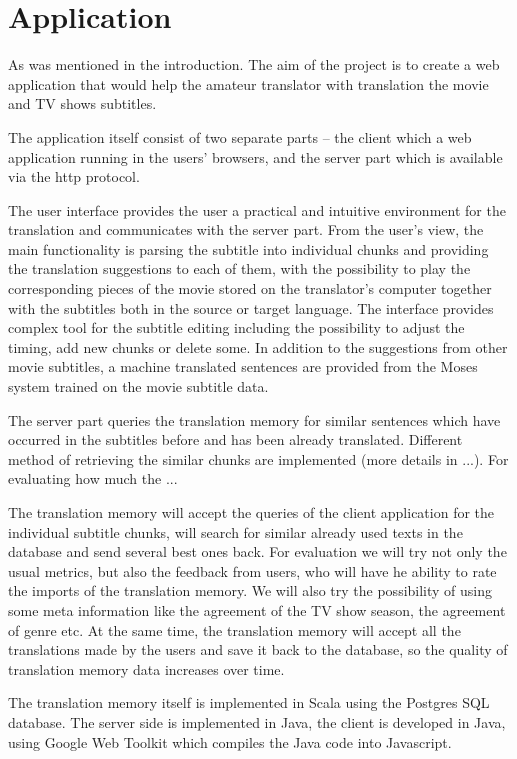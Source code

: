 \section{Application}

As was mentioned in the introduction. The aim of the project is to create a web application that would help the amateur translator with translation the movie and TV shows subtitles.

The application itself consist of two separate parts -- the client which a web application running in the users' browsers, and the server part which is available via the http protocol.

The user interface provides the user a practical and intuitive environment for the translation and communicates with the server part. From the user's view, the main functionality is parsing the subtitle into individual chunks and providing the translation suggestions to each of them, with the possibility to play the corresponding pieces of the movie stored on the translator's computer together with the subtitles both in the source or target language. The interface provides complex tool for the subtitle editing including the possibility to adjust the timing, add new chunks or delete some. In addition to the suggestions from other movie subtitles, a machine translated sentences are provided from the Moses system trained on the movie subtitle data.

The server part queries the translation memory for similar sentences which have occurred in the subtitles before and has been already translated. Different method of retrieving the similar chunks are implemented (more details in ...). For evaluating how much the ...

The translation memory will accept the queries of the client application for the individual subtitle chunks, will search for similar already used texts in the database and send several best ones back. For evaluation we will try not only the usual metrics, but also the feedback from users, who will have he ability to rate the imports of the translation memory. We will also try the possibility of using some meta information like the agreement
of the TV show season, the agreement of genre etc. At the same time, the translation memory will accept all the translations made by the users and save it back to the database, so the quality of translation memory data increases over time.

The translation memory itself is implemented in Scala using the Postgres SQL database. The server side is implemented in Java, the client is developed in Java, using Google Web Toolkit which compiles the Java code into Javascript.

